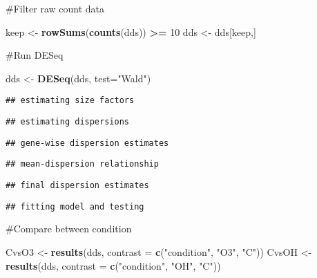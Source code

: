\documentclass[]{article}
\newenvironment{Shaded}{\begin{snugshade}}{\end{snugshade}}
\newcommand{\DataTypeTok}[1]{\textcolor[rgb]{0.13,0.29,0.53}{#1}}
\newcommand{\DecValTok}[1]{\textcolor[rgb]{0.00,0.00,0.81}{#1}}
\newcommand{\KeywordTok}[1]{\textcolor[rgb]{0.13,0.29,0.53}{\textbf{#1}}}
\newcommand{\NormalTok}[1]{#1}
\newcommand{\OperatorTok}[1]{\textcolor[rgb]{0.81,0.36,0.00}{\textbf{#1}}}
\newcommand{\StringTok}[1]{\textcolor[rgb]{0.31,0.60,0.02}{#1}}
\begin{document}
\#Filter raw count data

\begin{Shaded}
\begin{Highlighting}[]
\NormalTok{keep <-}\StringTok{ }\KeywordTok{rowSums}\NormalTok{(}\KeywordTok{counts}\NormalTok{(dds)) }\OperatorTok{>=}\StringTok{ }\DecValTok{10}
\NormalTok{dds <-}\StringTok{ }\NormalTok{dds[keep,]}
\end{Highlighting}
\end{Shaded}

\#Run DESeq

\begin{Shaded}
\begin{Highlighting}[]
\NormalTok{dds <-}\StringTok{ }\KeywordTok{DESeq}\NormalTok{(dds, }\DataTypeTok{test=}\StringTok{"Wald"}\NormalTok{)}
\end{Highlighting}
\end{Shaded}

\begin{verbatim}
## estimating size factors
\end{verbatim}

\begin{verbatim}
## estimating dispersions
\end{verbatim}

\begin{verbatim}
## gene-wise dispersion estimates
\end{verbatim}

\begin{verbatim}
## mean-dispersion relationship
\end{verbatim}

\begin{verbatim}
## final dispersion estimates
\end{verbatim}

\begin{verbatim}
## fitting model and testing
\end{verbatim}

\#Compare between condition

\begin{Shaded}
\begin{Highlighting}[]
\NormalTok{CvsO3 <-}\StringTok{ }\KeywordTok{results}\NormalTok{(dds, }\DataTypeTok{contrast =} \KeywordTok{c}\NormalTok{(}\StringTok{"condition"}\NormalTok{, }\StringTok{"O3"}\NormalTok{, }\StringTok{"C"}\NormalTok{))}
\NormalTok{CvsOH <-}\StringTok{ }\KeywordTok{results}\NormalTok{(dds, }\DataTypeTok{contrast =} \KeywordTok{c}\NormalTok{(}\StringTok{"condition"}\NormalTok{, }\StringTok{"OH"}\NormalTok{, }\StringTok{"C"}\NormalTok{))}
\end{Highlighting}
\end{Shaded}
\end{document}
